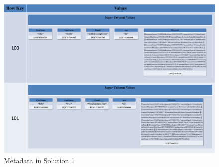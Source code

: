 \begin{landscape}
		\begin{figure}
			\centering
			\includegraphics[width=1.4\textwidth]{./figure/Solutions/Sol1-MD-ColumnFamily.png}	
			\caption{Metadata in Solution 1}\label{fd:Metadata-Solution1}
			\end{figure}
		\end{landscape}








